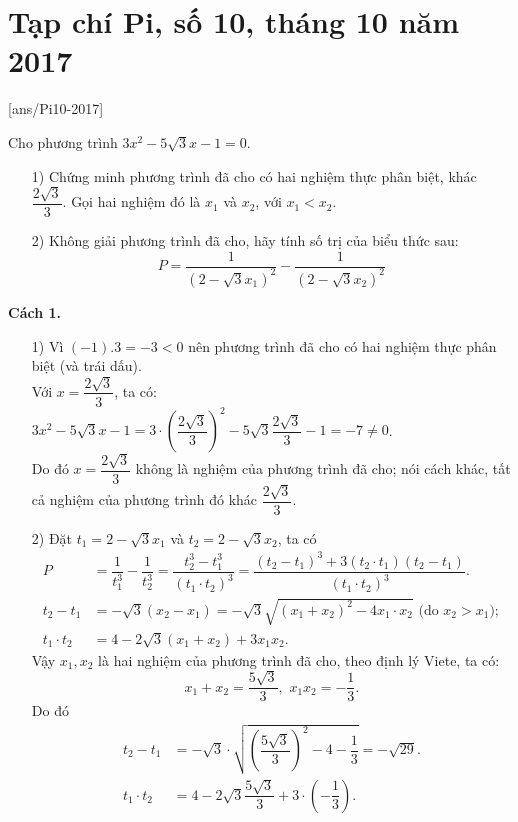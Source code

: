 \section{Tạp chí Pi, số 10,  tháng 10 năm 2017}
[ans/Pi10-2017]
\begin{bt}%
	Cho phương trình $3x^2-5\sqrt{3}x-1=0$.
	\begin{itemize}
		\item[1)] Chứng minh phương trình đã cho có hai nghiệm thực phân biệt, khác $\dfrac{2\sqrt{3}}{3}$. Gọi hai nghiệm đó là $x_1$ và $x_2$, với $x_1<x_2$.
		\item[2)] Không giải phương trình đã cho, hãy tính số trị của biểu thức sau:
		\[P=\dfrac{1}{(2-\sqrt{3}x_1)^2}-\dfrac{1}{(2-\sqrt{3}x_2)^2}\]
	\end{itemize}
	\loigiai
	{\textbf{Cách 1.}
		\begin{itemize}
			\item[1)] Vì $(-1).3=-3<0$ nên phương trình đã cho có hai nghiệm thực phân biệt (và trái dấu).\\
			Với $x=\dfrac{2\sqrt{3}}{3}$, ta có:
			$3x^2-5\sqrt{3}x-1=3\cdot(\dfrac{2\sqrt{3}}{3})^2-5\sqrt{3}\dfrac{2\sqrt{3}}{3}-1=-7\ne 0$.\\
			Do đó $x=\dfrac{2\sqrt{3}}{3}$ không là nghiệm của phương trình đã cho; nói cách khác, tất cả nghiệm của phương trình đó khác $\dfrac{2\sqrt{3}}{3}$.
			\item[2)] Đặt $t_1=2-\sqrt{3}x_1$ và  $t_2=2-\sqrt{3}x_2$, ta có
			{\allowdisplaybreaks
			\begin{align*}
			P&=\dfrac{1}{t_1^3}-\dfrac{1}{t_2^3}=\dfrac{t_2^3-t_1^3}{(t_1\cdot t_2)^3}=\dfrac{(t_2-t_1)^3+3(t_2\cdot t_1)(t_2-t_1)}{(t_1\cdot t_2)^3}.\tag{1}\\
			t_2-t_1&=-\sqrt{3}(x_2-x_1)=-\sqrt{3}\sqrt{(x_1+x_2)^2-4x_1\cdot x_2}\,\, \text{(do $x_2>x_1$)};\\
			t_1\cdot t_2&=4-2\sqrt{3}(x_1+x_2)+3x_1x_2.
			\end{align*}}Vậy $x_1, x_2$ là hai nghiệm của phương trình đã cho, theo định lý Viete, ta có:
			\[x_1+x_2=\dfrac{5\sqrt{3}}{3}, \,\,  x_1x_2=-\dfrac{1}{3}.\]
			Do đó
			{\allowdisplaybreaks
				\begin{align*}
			t_2-t_1&=-\sqrt{3}\cdot \sqrt{\left(\dfrac{5\sqrt{3}}{3}\right)^2-4-\dfrac{1}{3}}=-\sqrt{29}.\tag{2}\\
			t_1\cdot t_2&=4-2\sqrt{3}\dfrac{5\sqrt{3}}{3}+3\cdot\left(-\dfrac{1}{3}\right).\tag{3}

\end{align*}}
\end{itemize}}
\end{bt}
